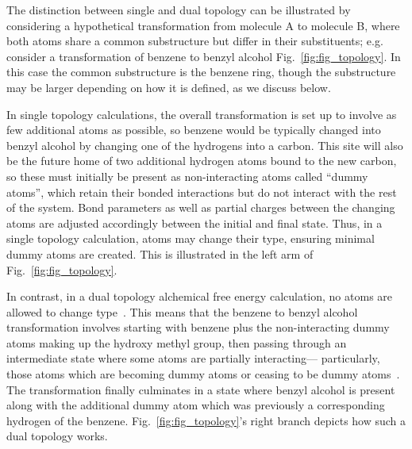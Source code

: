 \documentclass[9pt,bestpractices]{livecoms}
\begin{document}
The distinction between single and dual topology can be illustrated by considering a hypothetical transformation from molecule A to molecule B, where both atoms share a common substructure but differ in their substituents; e.g. consider a transformation of benzene to benzyl alcohol Fig.~\ref{fig:fig_topology}.
In this case the common substructure is the benzene ring, though the substructure may be larger depending on how it is defined, as we discuss below.

In single topology calculations, the overall transformation is set up to involve as few additional atoms as possible, so benzene would be typically changed into benzyl alcohol by changing one of the hydrogens into a carbon. This site will also be the future home of two additional hydrogen atoms bound to the new carbon, so these must initially be present as non-interacting atoms called ``dummy atoms'', which retain their bonded interactions but do not interact with the rest of the system.  Bond parameters as well as partial charges between the changing atoms are adjusted accordingly between the initial and final state. 
Thus, in a single topology calculation, atoms may change their type, ensuring minimal dummy atoms are created. This is illustrated in the left arm of Fig.~\ref{fig:fig_topology}. 

In contrast, in a dual topology alchemical free energy calculation, no atoms are allowed to change type~\cite{boresch1999rolea, shirts2012best}. This means that the benzene to benzyl alcohol transformation involves starting with benzene plus the non-interacting dummy atoms making up the hydroxy methyl group, then passing through an intermediate state where some atoms are partially interacting--- particularly, those atoms which are becoming dummy atoms or ceasing to be dummy atoms~\cite{mobley2014blind}. The transformation finally culminates in a state where benzyl alcohol is present along with the additional dummy atom which was previously a corresponding hydrogen of the benzene. Fig.~\ref{fig:fig_topology}'s right branch depicts how such a dual topology works. 
\end{document}
